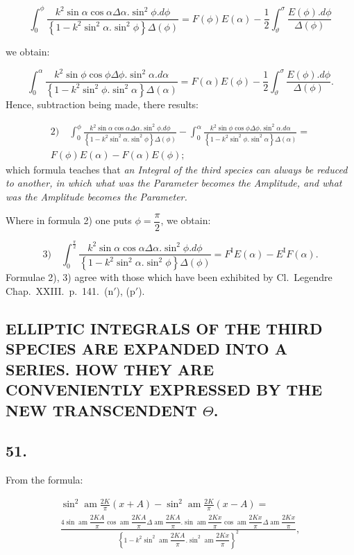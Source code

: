 \documentclass{article}
\begin{document}
\[
\int_{0}^{\phi}\frac{k^{2}\sin\alpha\cos\alpha\Delta\alpha.\sin^{2}\phi.d\phi}{\left\{1-k^{2}\sin^{2}\alpha.\sin^{2}\phi\right\}\Delta(\phi)}=F(\phi)E(\alpha)-\frac{1}{2}\int_{\vartheta}^{\sigma}\frac{E(\phi).d\phi}{\Delta(\phi)}
\]

we obtain:

\[
\int_{0}^{\alpha}\frac{k^{2}\sin\phi\cos\phi\Delta\phi.\sin^{2}\alpha.d\alpha}{\left\{1-k^{2}\sin^{2}\phi.\sin^{2}\alpha\right\}\Delta(\alpha)}=F(\alpha)E(\phi)-\frac{1}{2}\int_{\vartheta}^{\sigma}\frac{E(\phi).d\phi}{\Delta(\phi)}.
\]
Hence, subtraction being made, there results:

\[
\begin{gathered}
\text{2)}\quad\int_{0}^{\phi}\frac{k^{2}\sin\alpha\cos\alpha\Delta\alpha.\sin^{2}\phi.d\phi}{\left\{1-k^{2}\sin^{2}\alpha.\sin^{2}\phi\right\}\Delta(\phi)}-\int_{0}^{\alpha}\frac{k^{2}\sin\phi\cos\phi\Delta\phi.\sin^{2}\alpha.d\alpha}{\left\{1-k^{2}\sin^{2}\phi.\sin^{2}\alpha\right\}\Delta(\alpha)}=\\[1.5ex]
F(\phi)E(\alpha)-F(\alpha)E(\phi);
\end{gathered}
\]
which formula teaches that \emph{an Integral of the third species can always be reduced to another, in which what was the Parameter becomes the Amplitude, and what was the Amplitude becomes the Parameter.}

Where in formula 2) one puts $\phi=\dfrac{\pi}{2}$, we obtain:

\[
\text{3)}\quad\int_{0}^{\frac{\pi}{2}}\frac{k^{2}\sin\alpha\cos\alpha\Delta\alpha.\sin^{2}\phi.d\phi}{\left\{1-k^{2}\sin^{2}\alpha.\sin^{2}\phi\right\}\Delta(\phi)}=F^{\mathrm{I}}E(\alpha)-E^{\mathrm{I}}F(\alpha).
\]
Formulae 2), 3) agree with those which have been exhibited by Cl.\ Legendre Chap.\ XXIII.\ p.\ 141.\ (n$'$), (p$'$).

\subsection*{ELLIPTIC INTEGRALS OF THE THIRD SPECIES ARE EXPANDED INTO A SERIES. HOW THEY ARE CONVENIENTLY EXPRESSED BY THE NEW TRANSCENDENT $\Theta$.}

\subsection*{51.}

From the formula:

\[
\begin{gathered}
\sin^{2}\operatorname{am}\frac{2K}{\pi}(x+A)-\sin^{2}\operatorname{am}\frac{2K}{\pi}(x-A)=\\[1.5ex]
\frac{4\sin\operatorname{am}\dfrac{2KA}{\pi}\cos\operatorname{am}\dfrac{2KA}{\pi}\Delta\operatorname{am}\dfrac{2KA}{\pi}.\sin\operatorname{am}\dfrac{2Kx}{\pi}\cos\operatorname{am}\dfrac{2Kx}{\pi}\Delta\operatorname{am}\dfrac{2Kx}{\pi}}{\left\{1-k^{2}\sin^{2}\operatorname{am}\dfrac{2KA}{\pi}.\sin^{2}\operatorname{am}\dfrac{2Kx}{\pi}\right\}^{2}},
\end{gathered}
\]
\end{document}
